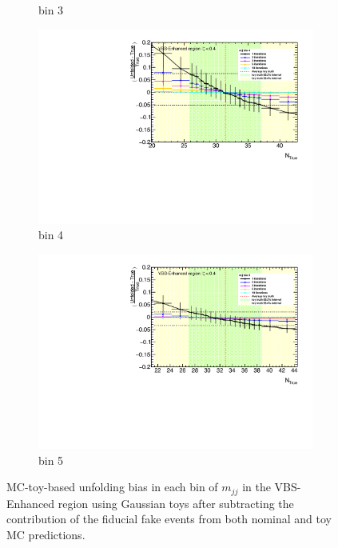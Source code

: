 \begin{figure}[htb]
\begin{subfigure}{.48\textwidth}
        \caption{ bin 3 }
    \end{subfigure}
    \begin{subfigure}{.48\textwidth}
        \centering
        \includegraphics[width=.9\linewidth]{figures/Analysis/Unfolding/unfolding_bias_mjj_noFakes_VBSEnh_bin4.pdf}
        \caption{bin 4 }
    \end{subfigure}
    \begin{subfigure}{.48\textwidth}
        \centering
        \includegraphics[width=.9\linewidth]{figures/Analysis/Unfolding/unfolding_bias_mjj_noFakes_VBSEnh_bin5.pdf}
        \caption{bin 5 }
    \end{subfigure}
    \caption{ MC-toy-based unfolding bias in each bin of $m_{jj}$ in the VBS-Enhanced region using Gaussian toys after subtracting the contribution of the fiducial fake events from both nominal and toy MC predictions.\label{fig:UnfoldingBias_mjj_VBSEnhanced_noFakes}}
\end{figure}

